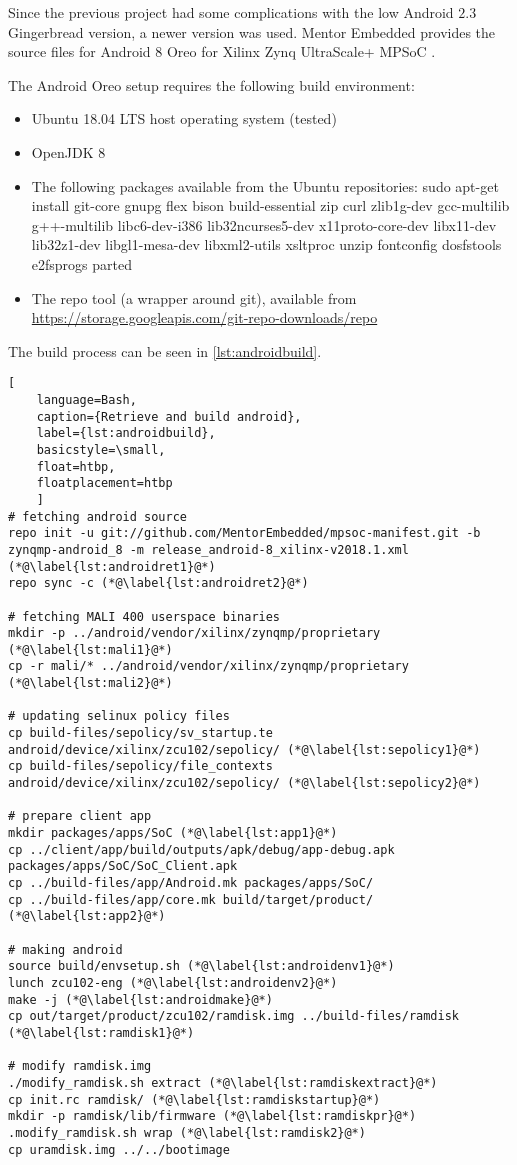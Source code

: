 Since the previous project \cite{oldrepo} had some complications with the low Android $2.3$ Gingerbread version, a newer version was used. Mentor Embedded provides the source files for Android $8$ Oreo for Xilinx Zynq UltraScale+ MPSoC \cite{androidsource}. 

The Android Oreo setup requires the following build environment:
\begin{itemize}
	\item Ubuntu 18.04 LTS host operating system (tested)
	\item OpenJDK 8
	\item The following packages available from the Ubuntu repositories:
		sudo apt-get install git-core gnupg flex bison build-essential zip curl zlib1g-dev gcc-multilib g++-multilib libc6-dev-i386 lib32ncurses5-dev x11proto-core-dev libx11-dev lib32z1-dev libgl1-mesa-dev libxml2-utils xsltproc unzip fontconfig dosfstools e2fsprogs parted
	\item The repo tool (a wrapper around git), available from\\
		\url{https://storage.googleapis.com/git-repo-downloads/repo}
\end{itemize}

The build process can be seen in \cref{lst:androidbuild}.
\begin{lstlisting}[
	language=Bash,
	caption={Retrieve and build android},
	label={lst:androidbuild},
	basicstyle=\small,
	float=htbp,
	floatplacement=htbp
	]
# fetching android source
repo init -u git://github.com/MentorEmbedded/mpsoc-manifest.git -b zynqmp-android_8 -m release_android-8_xilinx-v2018.1.xml (*@\label{lst:androidret1}@*)
repo sync -c (*@\label{lst:androidret2}@*)

# fetching MALI 400 userspace binaries
mkdir -p ../android/vendor/xilinx/zynqmp/proprietary (*@\label{lst:mali1}@*)
cp -r mali/* ../android/vendor/xilinx/zynqmp/proprietary (*@\label{lst:mali2}@*)

# updating selinux policy files
cp build-files/sepolicy/sv_startup.te android/device/xilinx/zcu102/sepolicy/ (*@\label{lst:sepolicy1}@*)
cp build-files/sepolicy/file_contexts android/device/xilinx/zcu102/sepolicy/ (*@\label{lst:sepolicy2}@*)

# prepare client app
mkdir packages/apps/SoC (*@\label{lst:app1}@*)
cp ../client/app/build/outputs/apk/debug/app-debug.apk packages/apps/SoC/SoC_Client.apk
cp ../build-files/app/Android.mk packages/apps/SoC/
cp ../build-files/app/core.mk build/target/product/ (*@\label{lst:app2}@*)

# making android
source build/envsetup.sh (*@\label{lst:androidenv1}@*)
lunch zcu102-eng (*@\label{lst:androidenv2}@*)
make -j (*@\label{lst:androidmake}@*)
cp out/target/product/zcu102/ramdisk.img ../build-files/ramdisk (*@\label{lst:ramdisk1}@*)

# modify ramdisk.img
./modify_ramdisk.sh extract (*@\label{lst:ramdiskextract}@*)
cp init.rc ramdisk/ (*@\label{lst:ramdiskstartup}@*)
mkdir -p ramdisk/lib/firmware (*@\label{lst:ramdiskpr}@*)
.modify_ramdisk.sh wrap (*@\label{lst:ramdisk2}@*)
cp uramdisk.img ../../bootimage
\end{lstlisting}

